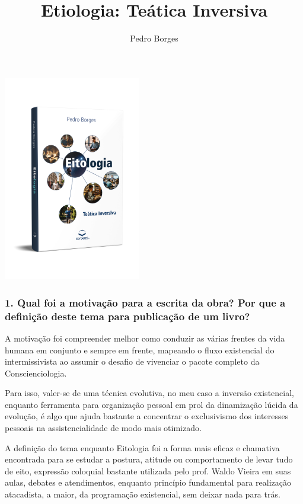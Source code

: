\documentclass{gescons}
\author{Pedro Borges}
\title{Etiologia: Teática Inversiva}
\begin{document}
    \makeentrevistatitle

    \begin{multicols}{2}

\begin{center}
    \vspace{-1cm}
    \includegraphics[width=6cm]{articles/entrevista/mockups/Pedro_Borges.png}
\end{center}

\vspace{-1cm}

\subsubsection{1.       Qual foi a motivação para a escrita da obra? Por que a definição deste tema para publicação de um livro?}

A motivação foi compreender melhor como conduzir as várias frentes da vida humana em conjunto e sempre em frente, mapeando o fluxo existencial do intermissivista ao assumir o desafio de vivenciar o pacote completo da Conscienciologia.

Para isso, valer-se de uma técnica evolutiva, no meu caso a inversão existencial, enquanto ferramenta para organização pessoal em prol da dinamização lúcida da evolução, é algo que ajuda bastante a concentrar o exclusivismo dos interesses pessoais na assistencialidade de modo mais otimizado.

A definição do tema enquanto Eitologia foi a forma mais eficaz e chamativa encontrada para se estudar a postura, atitude ou comportamento de levar tudo de eito, expressão coloquial bastante utilizada pelo prof. Waldo Vieira em suas aulas, debates e atendimentos, enquanto princípio fundamental para realização atacadista, a maior, da programação existencial, sem deixar nada para trás.


\end{multicols}
\end{document}
